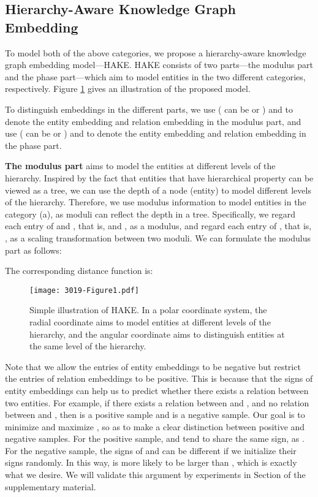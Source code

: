 \documentclass[letterpaper]{article} \usepackage{aaai20}  \usepackage{times}  \usepackage{helvet} \usepackage{courier}  \usepackage[hyphens]{url}  \usepackage{graphicx} \urlstyle{rm} \def\UrlFont{\rm}  \usepackage{graphicx}  \frenchspacing  \setlength{\pdfpagewidth}{8.5in}  \setlength{\pdfpageheight}{11in}
\begin{document}
\subsection{Hierarchy-Aware Knowledge Graph Embedding}
To model both of the above categories, we propose a hierarchy-aware knowledge graph embedding model---HAKE. HAKE consists of two parts---the modulus part and the phase part---which aim to model entities in the two different categories, respectively. Figure \ref{fig:mode_illustration} gives an illustration of the proposed model.

To distinguish embeddings in the different parts, we use  ( can be  or ) and  to denote the entity embedding and relation embedding in the modulus part, and use  ( can be  or ) and  to denote the entity embedding and relation embedding in the phase part.

\textbf{The modulus part} aims to model the entities at different levels of the hierarchy. Inspired by the fact that entities that have hierarchical property can be viewed as a tree, we can use the depth of a node (entity) to model different levels of the hierarchy. Therefore, we use modulus information to model entities in the category (a), as moduli can reflect the depth in a tree. Specifically, we regard each entry of  and , that is,  and , as a modulus, and regard each entry of , that is, , as a scaling transformation between two moduli. We can formulate the modulus part as follows:

The corresponding distance function is:


\begin{figure}[ht]
  \centering \texttt{[image: 3019-Figure1.pdf]}
\caption{Simple illustration of HAKE. In a polar coordinate system, the radial coordinate aims to model entities at different levels of the hierarchy, and the angular coordinate aims to distinguish entities at the same level of the hierarchy.}
\label{fig:mode_illustration}
\end{figure}

Note that we allow the entries of entity embeddings to be negative but restrict the entries of relation embeddings to be positive. This is because that the signs of entity embeddings can help us to predict whether there exists a relation between two entities. For example, if there exists a relation  between  and , and no relation between  and , then  is a positive sample and  is a negative sample. Our goal is to minimize  and maximize , so as to make a clear distinction between positive and negative samples. For the positive sample,  and  tend to share the same sign, as . For the negative sample, the signs of  and  can be different if we initialize their signs randomly. In this way,  is more likely to be larger than , which is exactly what we desire. We will validate this argument by experiments in Section  of the supplementary material.
\end{document}
